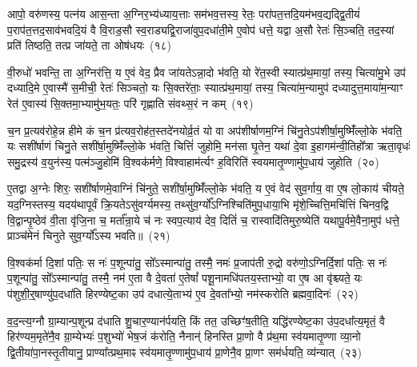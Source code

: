 {\anuvakamend[{यु॒ञ्जा॒नेष्वग्ने᳚ प्रा॒चीन॑मुत्ता॒नं वा॑म॒भृत॒ञ्चतु॑र्विꣳशतिश्च}]}%

आपो॒ वरु॑णस्य॒ पत्न॑य आस॒न्ता अ॒ग्निर॒भ्य॑ध्याय॒त्ताः सम॑भव॒त्तस्य॒ रेतः॒ परा॑पत॒त्तदि॒यम॑भव॒द्यद्द्वि॒तीयं॑ प॒राप॑त॒त्तद॒सा\-व॑भवदि॒यं वै वि॒राड॒सौ स्व॒राड्यद्वि॒राजा॑वुप॒दधा॑ती॒मे ए॒वोप॑ धत्ते॒ यद्वा अ॒सौ रेतः॑ सि॒ञ्चति॒ तद॒स्यां प्रति॑ तिष्ठति॒ तत्प्र जा॑यते॒ ता ओष॑धयः~(१८)

वी॒रुधो॑ भवन्ति॒ ता अ॒ग्निर॑त्ति॒ य ए॒वं वेद॒ प्रैव जा॑यते\-ऽन्ना॒दो भ॑वति॒ यो रे॑त॒स्वी स्यात्प्र॑थ॒मायां॒ तस्य॒ चित्या॑मु॒भे उप॑ दध्यादि॒मे ए॒वास्मै॑ स॒मीची॒ रेतः॑ सिञ्चतो॒ यः सि॒क्तरे॑ताः॒ स्यात्प्र॑थ॒मायां॒ तस्य॒ चित्या॑म॒न्यामुप॑ दध्यादुत्त॒माया॑\-म॒न्याꣳ रेत॑ ए॒वास्य॑ सि॒क्तमा॒भ्यामु॑भ॒यतः॒ परि॑ गृह्णाति संवथ्स॒रं न कम्~(१९)

च॒न प्र॒त्यव॑रोहे॒न्न हीमे कं च॒न प्र॑त्यव॒रोह॑त॒स्तदे॑नयोर्व्र॒तं यो वा अप॑शीर्\mbox{}षाणम॒ग्निं चि॑नु॒ते\-ऽप॑शीर्\mbox{}षा॒मुष्मिँ॑ल्लो॒के भ॑वति॒ यः सशी॑र्\mbox{}षाणं चिनु॒ते सशी॑र्\mbox{}षा॒मुष्मिँ॑ल्लो॒के भ॑वति॒ चित्तिं॑ जुहोमि॒ मन॑सा घृ॒तेन॒ यथा॑ दे॒वा इ॒हागम॑न्वी॒तिहो᳚त्रा ऋता॒वृधः॑ समु॒द्रस्य॑ व॒युन॑स्य॒ पत्म॑ञ्जु॒होमि॑ वि॒श्वक॑र्मणे॒ विश्वाहाम॑र्त्यꣳ ह॒विरिति॑ स्वयमातृ॒ण्णामु॑प॒धाय॑ जुहोति~(२०)

ए॒तद्वा अ॒ग्नेः शिरः॒ सशी॑र्\mbox{}षाणमे॒वाग्निं चि॑नुते॒ सशी॑र्\mbox{}षा॒मुष्मिँ॑ल्लो॒के भ॑वति॒ य ए॒वं वेद॑ सुव॒र्गाय॒ वा ए॒ष लो॒काय॑ चीयते॒ यद॒ग्निस्तस्य॒ यदय॑थापूर्वं क्रि॒यते\-ऽसु॑वर्ग्यमस्य॒ तथ्सु॑व॒र्ग्यो᳚\-ऽग्निश्चिति॑मुप॒धाया॒भि मृ॑शे॒च्चित्ति॒मचि॑त्तिं चिनव॒द्वि वि॒द्वान्पृ॒ष्ठेव॑ वी॒ता वृ॑जि॒ना च॒ मर्ता᳚न्रा॒ये च॑ नः स्वप॒त्याय॑ देव॒ दितिं॑ च॒ रास्वादि॑तिमुरु॒ष्येति॑ यथापू॒र्वमे॒वैना॒मुप॑ धत्ते॒ प्राञ्च॑मेनं चिनुते सुव॒र्ग्यो᳚\-ऽस्य भवति॥~(२१)

{\anuvakamend[{ओष॑धयः॒ कञ्जु॑होति स्वप॒त्याया॒ष्टाद॑श च}]}%

वि॒श्वक॑र्मा दि॒शां पतिः॒ स नः॑ प॒शून्पा॑तु॒ सो᳚\-ऽस्मान्पा॑तु॒ तस्मै॒ नमः॑ प्र॒जा\-प॑ती रु॒द्रो वरु॑णो॒\-ऽग्निर्दि॒शां पतिः॒ स नः॑ प॒शून्पा॑तु॒ सो᳚\-ऽस्मान्पा॑तु॒ तस्मै॒ नम॑ ए॒ता वै दे॒वता॑ ए॒तेषां᳚ पशू॒नामधि॑पतय॒स्ताभ्यो॒ वा ए॒ष आ वृ॑श्च्यते॒ यः प॑शुशी॒र्॒\mbox{}षाण्यु॑प॒दधा॑ति हिरण्येष्ट॒का उप॑ दधात्ये॒ताभ्य॑ ए॒व दे॒वता᳚भ्यो॒ नम॑स्करोति ब्रह्मवा॒दिनः॑~(२२)

व॒द॒न्त्य॒ग्नौ ग्रा॒म्यान्प॒शून्प्र द॑धाति शु॒चार॒ण्यान॑र्पयति॒ किं तत॒ उच्छिꣳ॑ष॒तीति॒ यद्धि॑रण्येष्ट॒का उ॑प॒दधा᳚त्य॒मृतं॒ वै हिर॑ण्यम॒मृते॑नै॒व ग्रा॒म्येभ्यः॑ प॒शुभ्यो॑ भेष॒जं क॑रोति॒ नैनान्॑ हिनस्ति प्रा॒णो वै प्र॑थ॒मा स्व॑यमातृ॒ण्णा व्या॒नो द्वि॒तीया॑पा॒नस्तृ॒तीयानु॒ प्राण्या᳚त्प्रथ॒माꣴ स्व॑यमातृ॒ण्णामु॑प॒धाय॑ प्रा॒णेनै॒व प्रा॒णꣳ सम॑र्धयति॒ व्य॑न्यात्~(२३)

